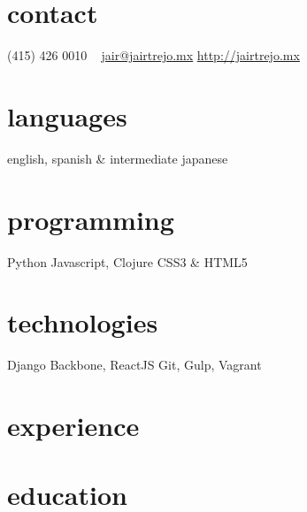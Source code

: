 \documentclass[]{friggeri-cv} %
\def\mystar{{\FA \faStar}}
\begin{document}


\begin{aside} %
\section{contact}
(415) 426 0010
~
\href{mailto:jair@jairtrejo.mx}{jair@jairtrejo.mx}
\href{http://jairtrejo.mx}{http://jairtrejo.mx}
\section{languages}
english, spanish \&
intermediate japanese
\section{programming}
{\color{red} \mystar} Python
Javascript, Clojure
CSS3 \& HTML5
\section{technologies}
Django
Backbone, ReactJS
Git, Gulp, Vagrant
\end{aside}


\section{experience}

\begin{entrylist}

\end{entrylist}


\section{education}
\end{document}

